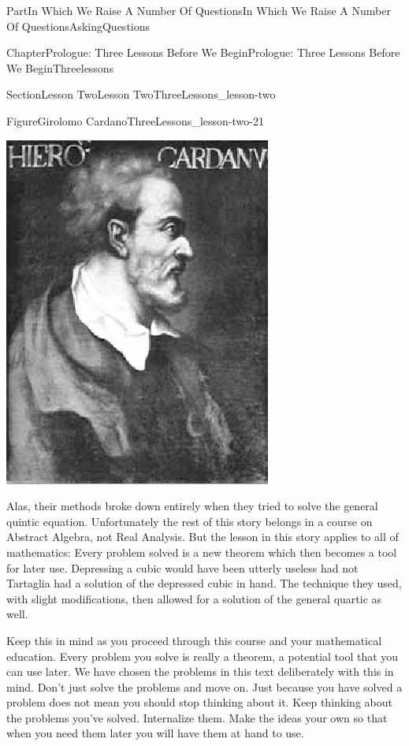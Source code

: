 \documentclass[oneside,10pt,]{book}
\numberwithin{equation}{part}
\begin{document}
\begin{partptx}{Part}{In Which We Raise A Number Of Questions}{}{In Which We Raise A Number Of Questions}{}{}{AskingQuestions}
\begin{chapterptx}{Chapter}{Prologue: Three Lessons Before We Begin}{}{Prologue: Three Lessons Before We Begin}{}{}{Threelessons}
\begin{sectionptx}{Section}{Lesson Two}{}{Lesson Two}{}{}{ThreeLessons_lesson-two}
\begin{figureptx}{Figure}{Girolomo Cardano}{ThreeLessons_lesson-two-21}{}
\begin{image}{0.325}{0.35}{0.325}{}
\includegraphics[width=\linewidth]{external/images/Cardan.png}
\end{image}%
\tcblower
\end{figureptx}%
Alas, their methods broke down entirely when they tried to solve the general quintic equation.  Unfortunately the rest of this story belongs in a course on Abstract Algebra, not Real Analysis.  But the lesson in this story applies to all of mathematics: Every problem solved is a new theorem which then becomes a tool for later use.  Depressing a cubic would have been utterly useless had not Tartaglia had a solution of the depressed cubic in hand.  The technique they used, with slight modifications, then allowed for a solution of the general quartic as well.%
\par
Keep this in mind as you proceed through this course and your mathematical education.  Every problem you solve is really a theorem, a potential tool that you can use later.  We have chosen the problems in this text deliberately with this in mind. Don't just solve the problems and move on.  Just because you have solved a problem does not mean you should stop thinking about it.  Keep thinking about the problems you've solved. Internalize them.  Make the ideas your own so that when you need them later you will have them at hand to use.%

\end{sectionptx}
\end{chapterptx}
\end{partptx}
\end{document}
